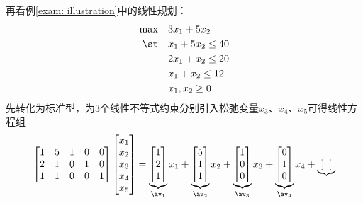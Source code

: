 \documentclass{ctexart}
\begin{document}
\begin{example} \label{exam: simplex}
    再看例\ref{exam: illustration}中的线性规划：
    \begin{align*}
        \max \quad & 3 x_1 + 5 x_2      \\
        \st  \quad & x_1 + 5 x_2 \le 40 \\
                   & 2 x_1 + x_2 \le 20 \\
                   & x_1 + x_2 \le 12   \\
                   & x_1,x_2 \ge 0
    \end{align*}
    先转化为标准型，为$3$个线性不等式约束分别引入松弛变量$x_3$、$x_4$、$x_5$可得线性方程组
    \begin{align*}
        \begin{bmatrix}
            1 & 5 & 1 & 0 & 0 \\
            2 & 1 & 0 & 1 & 0 \\
            1 & 1 & 0 & 0 & 1
        \end{bmatrix}
        \begin{bmatrix}
            x_1 \\ x_2 \\ x_3 \\ x_4 \\ x_5
        \end{bmatrix} =
        \underbrace{\begin{bmatrix}
                            1 \\ 2 \\ 1
                        \end{bmatrix}}_{\av_1} x_1 +
        \underbrace{\begin{bmatrix}
                            5 \\ 1 \\ 1
                        \end{bmatrix}}_{\av_2} x_2 +
        \underbrace{\begin{bmatrix}
                            1 \\ 0 \\ 0
                        \end{bmatrix}}_{\av_3} x_3 +
        \underbrace{\begin{bmatrix}
                            0 \\ 1 \\ 0
                        \end{bmatrix}}_{\av_4} x_4 +
        \underbrace{\begin{bmatrix}

\end{bmatrix}}
\end{align*}
\end{example}
\end{document}
